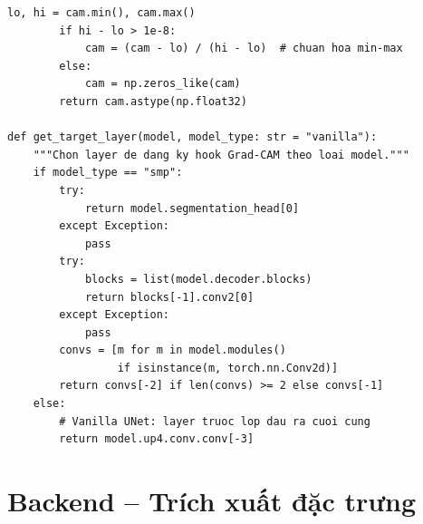 \begin{lstlisting}[style=codePython, caption={Trien khai Grad-CAM voi PyTorch forward/backward hooks }]
        lo, hi = cam.min(), cam.max()
        if hi - lo > 1e-8:
            cam = (cam - lo) / (hi - lo)  # chuan hoa min-max
        else:
            cam = np.zeros_like(cam)
        return cam.astype(np.float32)

def get_target_layer(model, model_type: str = "vanilla"):
    """Chon layer de dang ky hook Grad-CAM theo loai model."""
    if model_type == "smp":
        try:
            return model.segmentation_head[0]
        except Exception:
            pass
        try:
            blocks = list(model.decoder.blocks)
            return blocks[-1].conv2[0]
        except Exception:
            pass
        convs = [m for m in model.modules()
                 if isinstance(m, torch.nn.Conv2d)]
        return convs[-2] if len(convs) >= 2 else convs[-1]
    else:
        # Vanilla UNet: layer truoc lop dau ra cuoi cung
        return model.up4.conv.conv[-3]
\end{lstlisting}

\section[Backend -- Trích xuất đặc trưng]{Backend -- Trích xuất đặc trưng}

